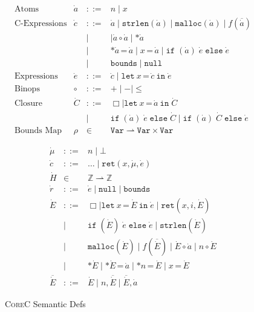 \documentclass[conference]{IEEEtran}
\newcommand{\elang}{\textsc{CoreC}\xspace}
\newcommand{\kw}[1]{\ensuremath{\mathtt{#1}}}
\newcommand{\estrlen}[1]{\ensuremath{\kw{strlen}({#1})}}
\newcommand{\emalloc}[1]{\ensuremath{\kw{malloc}({#1})}}
\newcommand{\ecall}[2]{\ensuremath{{#1}({#2})}}
\newcommand{\elet}[3]{\ensuremath{\kw{let}~#1\, \texttt{=}\, #2~\kw{in}\;{#3}}}
\newcommand{\eassign}[2]{\ensuremath{\texttt{*}{#1}\,\texttt{=}\, {#2}}}
\newcommand{\eassignstack}[2]{\ensuremath{{#1}\,\texttt{=}\, {#2}}}
\newcommand{\estar}[1]{\ensuremath{\texttt{*}{#1}}}
\newcommand{\eif}[3]{\ensuremath{\kw{if\;}(#1)\;{#2}\;\kw{else}\;{#3}}}
\newcommand{\ebounds}{\ensuremath{\kw{bounds}}}
\newcommand{\enull}{\ensuremath{\kw{null}}}
\newcommand{\hole}{\ensuremath{\Box}}
\newcommand{\eret}[3]{\ensuremath{\kw{ret}({#1},{#2},{#3})}}
\begin{document}
\begin{figure}[h]
{\small
  \[\begin{array}{llcl}
      \text{Atoms}       & \dot a & ::= & n \mid x \\
      
      \text{C-Expressions} & \dot c & ::= & \dot a \mid \estrlen{\dot a}  \mid \emalloc {\dot  a}  \mid \ecall{f} {\overline{\dot a}}  \\
                         & & \mid &  \mid  \dot a \circ \dot a \mid \estar{\dot a} \\
                         & & \mid & \eassign{\dot a}{\dot a} \mid \eassignstack{x}{\dot a}  \mid \eif{\dot a}{\dot e}{\dot e} \\
                         & & \mid & \ebounds \mid \enull \\
      \text{Expressions}  & \dot e & ::= & \dot c \mid \elet{x}{\dot c}{\dot e}\\
      \text{Binops} & \circ & ::= & + \mid - \mid \leq  \\
      \text{Closure} & \dot C & ::= & \hole \mid \elet{x}{\dot a}{\dot C} \\
       & & \mid & \eif{\dot a}{\dot e}{\dot C} \mid \eif{\dot a}{\dot    C}{\dot e} \\
      \text{Bounds Map} & \rho & \in & \texttt{Var} \rightharpoonup \texttt{Var} \times \texttt{Var}
  \end{array}
  \]
}
  \caption{\elang{} Syntax}
  \label{fig:syntaxerased}
{\small
  \[\begin{array}{lll}
    \dot \mu & ::= & n \mid \bot \\
    \dot c & ::= & \ldots  \mid \eret{x}{\dot \mu}{\dot e} \\
    \dot H & \in & \mathbb{Z} \rightharpoonup \mathbb{Z} \\
    \dot r & ::= & \dot e \mid \enull \mid \ebounds \\
    \dot E & ::= & \hole \mid  \elet{x}{\dot E}{\dot e}  \mid \eret{x}{i}{\dot E} \\
             & \mid & \eif{\dot E}{\dot e}{\dot e} \mid \estrlen{\dot E} \\
             & \mid & \emalloc{\dot E} \mid \ecall{f}{\overline{\dot
                      E}} \mid \dot E \circ \dot a \mid n \circ \dot E \\
             & \mid & \estar{\dot E} \mid \eassign{\dot E}{\dot a}
                      \mid \eassign{n}{\dot E} \mid
                      \eassignstack{x}{\dot E} \\
      \overline{\dot E } & ::= & \dot E \mid n,\overline{\dot E} \mid
                                 \overline{\dot E}, \dot a
                      
  \end{array} \]
}
  \caption{\elang Semantic Defs}
  \label{fig:semanticserased}
\end{figure}
\end{document}
